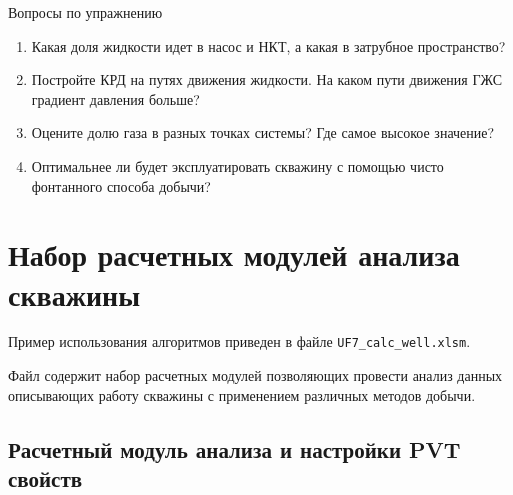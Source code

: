 Вопросы по упражнению
\begin{enumerate}
	\item  Какая доля жидкости идет в насос и НКТ, а какая в затрубное пространство?
	\item  Постройте КРД на путях движения жидкости. На каком пути движения ГЖС градиент давления больше?
	\item Оцените долю газа в разных точках системы? Где самое высокое значение?
	\item Оптимальнее ли будет эксплуатировать скважину с помощью чисто фонтанного способа добычи?
\end{enumerate}


\section{Набор расчетных модулей анализа скважины}
Пример использования алгоритмов \unf   приведен в файле \texttt{UF7\_calc\_well.xlsm}.

Файл содержит набор расчетных модулей позволяющих провести анализ данных описывающих работу скважины с применением различных методов добычи.

\subsection{Расчетный модуль анализа и настройки PVT свойств}


